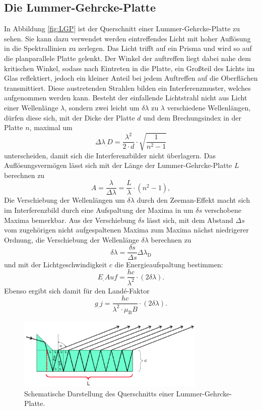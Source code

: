 \subsection{Die Lummer-Gehrcke-Platte}
In Abbildung \ref{fig:LGP} ist der Querschnitt einer Lummer-Gehrcke-Platte zu sehen.
Sie kann dazu verwendet werden eintreffendes Licht mit hoher Auflösung in die Spektrallinien zu zerlegen.
Das Licht trifft auf ein Prisma und wird so auf die planparallele Platte gelenkt. Der Winkel der auftreffen liegt dabei nahe dem kritischen Winkel, sodass nach Eintreten in die Platte, ein Großteil des Lichts im Glas reflektiert, jedoch ein kleiner Anteil bei jedem Auftreffen auf die Oberflächen transmittiert. Diese austretenden Strahlen bilden ein Interferenzmuster, welches aufgenommen werden kann.
Besteht der einfallende Lichtstrahl nicht aus Licht einer Wellenlänge $\lambda$, sondern zwei leicht um $\delta \lambda$ zu $\lambda$ verschiedene Wellenlängen, dürfen diese sich, mit der Dicke der Platte $d$ und dem Brechungsindex in der Platte $n$, maximal um
\begin{equation}
	\Delta\lambda_.{D} = \frac{\lambda^2}{2 \cdot d} \cdot \sqrt{\frac{1}{n^2-1}} \label{eq:disGebiet}
\end{equation}
unterscheiden, damit sich die Interferenzbilder nicht überlagern.
Das Auflösungsvermögen lässt sich mit der Länge der Lummer-Gehrcke-Platte $L$ berechnen zu
\begin{equation}
	A = \frac{\lambda}{\Delta\lambda} = \frac{L}{\lambda} \cdot \left(n^2-1\right), \label{eq:Aufloesung}
\end{equation}
Die Verschiebung der Wellenlängen um $\delta \lambda$ durch den Zeeman-Effekt macht sich im Interferenzbild durch eine Aufspaltung der Maxima in um $\delta s $ verschobene Maxima bemerkbar. Aus der Verschiebung $\delta s$ lässt sich, mit dem Abstand $\Delta s$ vom zugehörigen nicht aufgespaltenen Maxima zum Maxima nächst niedrigerer Ordnung, die Verschiebung der Wellenlänge $\delta \lambda$ berechnen zu
\begin{equation}
\delta \lambda = \frac{\delta s}{\Delta s} \Delta\lambda_\text{D} \label{eq:deltaLambda}
\end{equation}
und mit der Lichtgeschwindigkeit $c$ die Energieaufspaltung bestimmen:
\begin{equation}
E_.{Auf}=\frac{h c}{\lambda^2} \cdot (2\delta \lambda)\text{.} \label{eq:EaufExp}
\end{equation}
Ebenso ergibt sich damit für den Landé-Faktor
\begin{equation}
g_.{j}=\frac{h c}{\lambda^2 \cdot \mu_\text{B} B} \cdot (2\delta \lambda)\text{.} \label{eq:exgj}
\end{equation}
\begin{figure}
\includegraphics[width=0.8\textwidth]{content/images/LGP.pdf}
\caption{Schematische Darstellung des Querschnitts einer Lummer-Gehrcke-Platte.\cite{V27}}
\end{figure}
